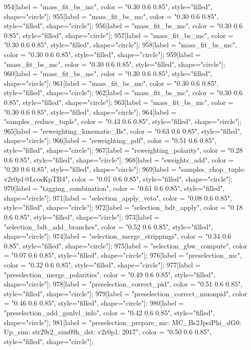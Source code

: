 {	954[label = "mass_fit_bs_mc", color = "0.30 0.6 0.85", style="filled", shape="circle"];
	955[label = "mass_fit_bs_mc", color = "0.30 0.6 0.85", style="filled", shape="circle"];
	956[label = "mass_fit_bs_mc", color = "0.30 0.6 0.85", style="filled", shape="circle"];
	957[label = "mass_fit_bs_mc", color = "0.30 0.6 0.85", style="filled", shape="circle"];
	958[label = "mass_fit_bs_mc", color = "0.30 0.6 0.85", style="filled", shape="circle"];
	959[label = "mass_fit_bs_mc", color = "0.30 0.6 0.85", style="filled", shape="circle"];
	960[label = "mass_fit_bs_mc", color = "0.30 0.6 0.85", style="filled", shape="circle"];
	961[label = "mass_fit_bs_mc", color = "0.30 0.6 0.85", style="filled", shape="circle"];
	962[label = "mass_fit_bs_mc", color = "0.30 0.6 0.85", style="filled", shape="circle"];
	963[label = "mass_fit_bs_mc", color = "0.30 0.6 0.85", style="filled", shape="circle"];
	964[label = "samples_reduce_tuple", color = "0.43 0.6 0.85", style="filled", shape="circle"];
	965[label = "reweighting_kinematic_Bs", color = "0.63 0.6 0.85", style="filled", shape="circle"];
	966[label = "reweighting_pdf", color = "0.51 0.6 0.85", style="filled", shape="circle"];
	967[label = "reweighting_polarity", color = "0.28 0.6 0.85", style="filled", shape="circle"];
	968[label = "sweights_add", color = "0.20 0.6 0.85", style="filled", shape="circle"];
	969[label = "samples_chop_tuple\nversion: v2r0p1@LcosKpTB4", color = "0.01 0.6 0.85", style="filled", shape="circle"];
	970[label = "tagging_combination", color = "0.61 0.6 0.85", style="filled", shape="circle"];
	971[label = "selection_apply_veto", color = "0.08 0.6 0.85", style="filled", shape="circle"];
	972[label = "selection_bdt_apply", color = "0.18 0.6 0.85", style="filled", shape="circle"];
	973[label = "selection_bdt_add_branches", color = "0.52 0.6 0.85", style="filled", shape="circle"];
	974[label = "selection_merge_strippings", color = "0.34 0.6 0.85", style="filled", shape="circle"];
	975[label = "selection_gbw_compute", color = "0.07 0.6 0.85", style="filled", shape="circle"];
	976[label = "preselection_mc", color = "0.32 0.6 0.85", style="filled", shape="circle"];
	977[label = "preselection_merge_polarities", color = "0.49 0.6 0.85", style="filled", shape="circle"];
	978[label = "preselection_correct_pid", color = "0.51 0.6 0.85", style="filled", shape="circle"];
	979[label = "preselection_correct_muonpid", color = "0.46 0.6 0.85", style="filled", shape="circle"];
	980[label = "preselection_add_genlvl_info", color = "0.42 0.6 0.85", style="filled", shape="circle"];
	981[label = "preselection_prepare_mc\nmode: MC_Bs2JpsiPhi_dG0\npolarity: Up\nstrip_sim: str29r2_sim09h_dst\nversion: v2r0p1\nyear: 2017", color = "0.50 0.6 0.85", style="filled", shape="circle"];
}
